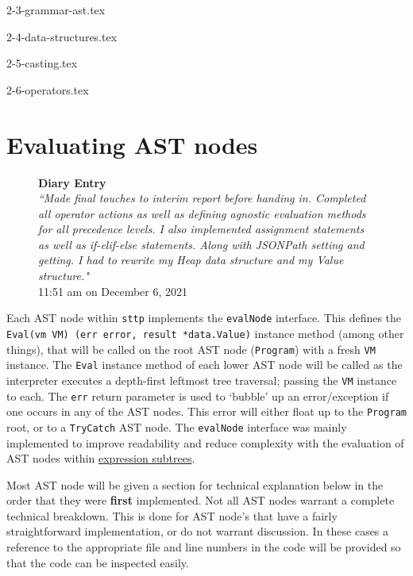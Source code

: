 \documentclass[]{full}
\theoremstyle{definition}
\begin{document}
{2-3-grammar-ast.tex}

{2-4-data-structures.tex}

{2-5-casting.tex}

{2-6-operators.tex}

\section{Evaluating AST nodes}

\begin{figure}[H]
    \begin{center}
        \textbf{Diary Entry}\\[0.5em]
        \textit{``Made final touches to interim report before handing in. Completed all operator actions as well as defining agnostic evaluation methods for all precedence levels. I also implemented assignment statements as well as if-elif-else statements. Along with JSONPath setting and getting. I had to rewrite my Heap data structure and my Value structure."}\\[0.5em]
        \tiny{11:51 am on December 6, 2021}
    \end{center}
\end{figure}
    
Each AST node within \verb|sttp| implements the \verb|evalNode| interface. This defines the \texttt{Eval(vm VM) (err error, result *data.Value)} instance method (among other things), that will be called on the root AST node (\verb|Program|) with a fresh \verb|VM| instance. The \verb|Eval| instance method of each lower AST node will be called as the interpreter executes a depth-first leftmost tree traversal; passing the \verb|VM| instance to each. The \verb|err| return parameter is used to `bubble' up an error/exception if one occurs in any of the AST nodes. This error will either float up to the \verb|Program| root, or to a \verb|TryCatch| AST node. The \verb|evalNode| interface was mainly implemented to improve readability and reduce complexity with the evaluation of AST nodes within \hyperref[sec:development-ast-nodes-expressions]{expression subtrees}.

Most AST node will be given a section for technical explanation below in the order that they were \textbf{first} implemented. Not all AST nodes warrant a complete technical breakdown. This is done for AST node's that have a fairly straightforward implementation, or do not warrant discussion. In these cases a reference to the appropriate file and line numbers in the code will be provided so that the code can be inspected easily.
\end{document}
